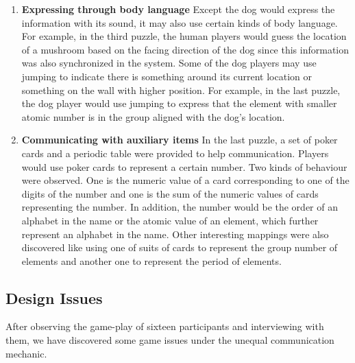 \documentclass{sigchi}
\begin{document}
\begin{enumerate}
\item \textbf{Expressing through body language}\newline
Except the dog would express the information with its sound, it may also use certain kinds of body language. 
For example, in the third puzzle, the human players would guess the location of a mushroom based on the facing direction of the dog since this information was also synchronized in the system. Some of the dog players may use jumping to indicate there is something around its current location or something on the wall with higher position. For example, in the last puzzle, the dog player would use jumping to express that the element with smaller atomic number is in the group aligned with the dog's location.

\item \textbf{Communicating with auxiliary items}\newline
In the last puzzle, a set of poker cards and a periodic table were provided to help communication. Players would use poker cards to represent a certain number. Two kinds of behaviour were observed. One is the numeric value of a card corresponding to one of the digits of the number and one is the sum of the numeric values of cards representing the number. In addition, the number would be the order of an alphabet in the name or the atomic value of an element, which further represent an alphabet in the name. Other interesting mappings were also discovered like using one of suits of cards to represent the group number of elements and another one to represent the period of elements.

\end{enumerate}

\subsection{Design Issues}
After observing the game-play of sixteen participants and interviewing with them, we have discovered some game issues under the unequal communication mechanic.
\end{document}
